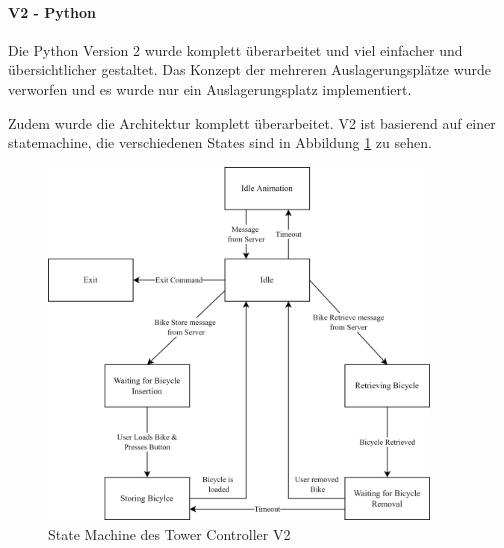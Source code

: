 \paragraph{V2 - Python}
Die Python Version 2 wurde komplett überarbeitet und viel einfacher und übersichtlicher gestaltet. Das Konzept der mehreren Auslagerungsplätze wurde verworfen und es wurde nur ein Auslagerungsplatz implementiert.

Zudem wurde die Architektur komplett überarbeitet. V2 ist basierend auf einer \Gls{statemachine}, die verschiedenen States sind in Abbildung \ref{fig:tower_controller_v1_state_machine} zu sehen.

\begin{figure}[H]
  \centering
  \includegraphics[width=0.9\textwidth]{images/tower_controller_v2_state_machine.png}
  \caption{State Machine des Tower Controller V2}
  \label{fig:tower_controller_v1_state_machine}
\end{figure}

\clearpage

